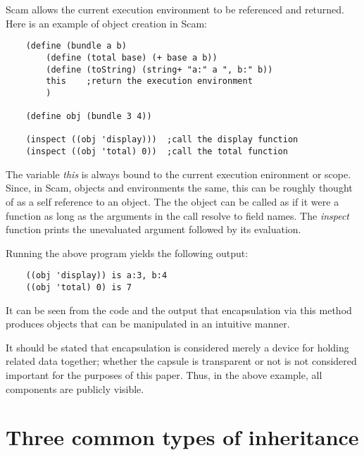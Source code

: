 {{Scam 
allows the current execution environment
to be referenced and returned.
Here is an example of object creation in Scam:

\begin{verbatim}
    (define (bundle a b)
        (define (total base) (+ base a b))
        (define (toString) (string+ "a:" a ", b:" b))
        this    ;return the execution environment
        )

    (define obj (bundle 3 4))

    (inspect ((obj 'display)))  ;call the display function
    (inspect ((obj 'total) 0))  ;call the total function
\end{verbatim}

The variable {\it this} is always bound to the current execution
enironment or scope. Since, in Scam, objects and environments the same,
this can be roughly thought of as a self reference to an object. The
the object can be called as if it were a function as long as the arguments
in the call resolve to field names.
The {\it inspect} function prints the unevaluated argument followed by
its evaluation.

Running the above program yields the following output:

\begin{verbatim}
    ((obj 'display)) is a:3, b:4
    ((obj 'total) 0) is 7
\end{verbatim}

It can be seen from the code and the output that encapsulation via this
method produces objects that can be manipulated in an intuitive manner.

It should be stated that encapsulation is considered merely a device for
holding related data together; whether the capsule is transparent or
not is not considered important for the purposes of this paper. Thus,
in the above example, all components are publicly visible. 

\section{Three common types of inheritance}

}}

